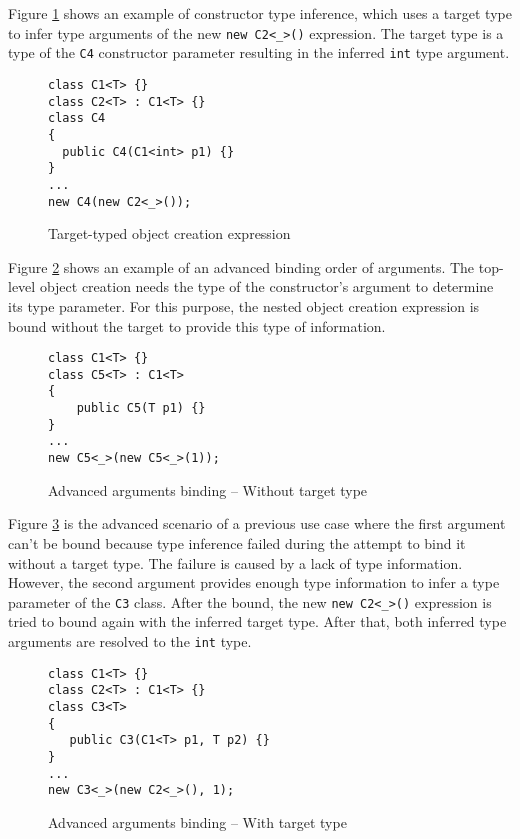 \par
Figure \ref{img76:example4} shows an example of constructor type inference, which uses a target type to infer type arguments of the new \texttt{new C2<\_>()} expression. 
The target type is a type of the \texttt{C4} constructor parameter resulting in the inferred \texttt{int} type argument.
\begin{figure}[!h]
\begin{lstlisting}[style=csharp, showstringspaces=false]
class C1<T> {}
class C2<T> : C1<T> {}
class C4 
{
  public C4(C1<int> p1) {}
}
...
new C4(new C2<_>());
\end{lstlisting}
\caption{Target-typed object creation expression}
\label{img76:example4}
\end{figure}
\par
Figure \ref{img77:example5} shows an example of an advanced binding order of arguments. 
The top-level object creation needs the type of the constructor’s argument to determine its type parameter. 
For this purpose, the nested object creation expression is bound without the target to provide this type of information.
\begin{figure}[!h]
\begin{lstlisting}[style=csharp, showstringspaces=false]
class C1<T> {}
class C5<T> : C1<T>
{
    public C5(T p1) {}
}
...
new C5<_>(new C5<_>(1));
\end{lstlisting}
\caption{Advanced arguments binding -- Without target type}
\label{img77:example5}
\end{figure}
\par
Figure \ref{img78:example6} is the advanced scenario of a previous use case where the first argument can’t be bound because type inference failed during the attempt to bind it without a target type.
The failure is caused by a lack of type information. 
However, the second argument provides enough type information to infer a type parameter of the \texttt{C3} class. 
After the bound, the new \texttt{new C2<\_>()} expression is tried to bound again with the inferred target type.
After that, both inferred type arguments are resolved to the \texttt{int} type.
\begin{figure}[!h]
\begin{lstlisting}[style=csharp, showstringspaces=false]
class C1<T> {}
class C2<T> : C1<T> {}
class C3<T>
{
   public C3(C1<T> p1, T p2) {}
}
...
new C3<_>(new C2<_>(), 1);
\end{lstlisting}
\caption{Advanced arguments binding -- With target type}
\label{img78:example6}
\end{figure}

